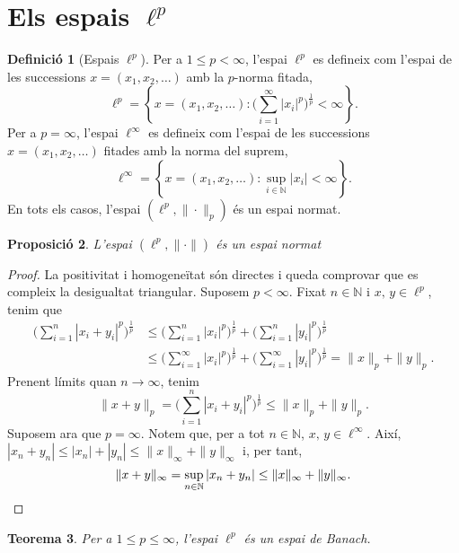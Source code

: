 \documentclass[12pt]{book}
\newtheorem{teorema}{Teorema}[chapter]
\newtheorem{prop}[teorema]{Proposició}
\theoremstyle{definition}
\newtheorem{defi}[teorema]{Definició}
\theoremstyle{nota}
\theoremstyle{exemple}
\begin{document}
\section{Els espais \texorpdfstring{$\ell^p$}{lp}}

\begin{defi}[Espais $\ell^p$]
  Per a $1 \leq p < \infty$, l'espai $\ell^p$ es defineix com l'espai
  de les successions $x = (x_1, x_2, \dotsc)$ amb la $p$-norma fitada,
  \[
    \ell^p = \left\{ x = (x_1, x_2, \dotsc) : \Big(
      \sum_{i=1}^{\infty} |x_i|^p \Big)^{\frac{1}{p}} < \infty
    \right\}.
  \]
  Per a $p = \infty$, l'espai $\ell^\infty$ es defineix com l'espai de
  les successions $x = (x_1, x_2, \dotsc)$ fitades amb la norma del
  suprem,
  \[
    \ell^\infty = \left\{ x = (x_1, x_2, \dotsc) : \sup_{i \in
        \mathbb{N}} |x_i| < \infty \right\}.
  \]
  En tots els casos, l'espai $(\ell^p, \|\cdot\|_p)$ és un espai
  normat.
\end{defi}

\begin{prop}
  L'espai $(\ell^p, \|\cdot\|)$ és un espai normat
\end{prop}

\begin{proof}
  La positivitat i homogeneïtat són directes i queda comprovar que es
  compleix la desigualtat triangular. Suposem $p < \infty$. Fixat
  $n \in \mathbb{N}$ i $x,\, y \in \ell^p$, tenim que
  \begin{align*}
    \Big( \sum_{i=1}^{n} |x_i+y_i|^p \Big)^{\frac{1}{p}}
    &\leq \Big( \sum_{i=1}^{n} |x_i|^p \Big)^{\frac{1}{p}}
      + \Big( \sum_{i=1}^{n} |y_i|^p \Big)^{\frac{1}{p}} \\
    &\leq \Big( \sum_{i=1}^{\infty} |x_i|^p \Big)^{\frac{1}{p}}
      + \Big( \sum_{i=1}^{\infty} |y_i|^p \Big)^{\frac{1}{p}}
      = \|x\|_p + \|y\|_p.
  \end{align*}
  Prenent límits quan $n \to \infty$, tenim
  \[
    \|x+y\|_p = \Big( \sum_{i=1}^{n} |x_i+y_i|^p \Big)^{\frac{1}{p}}
    \leq \|x\|_p + \|y\|_p.
  \]
  Suposem ara que $p = \infty$. Notem que, per a tot
  $n \in \mathbb{N}$, $x,\, y \in \ell^\infty$. Així,
  $|x_n + y_n| \leq |x_n| + |y_n| \leq \|x\|_\infty + \|y\|_\infty$ i,
  per tant,
  \[
    \|x+y\|_\infty = \sup_{n \in \mathbb{N}} |x_n+y_n| \leq
    \|x\|_\infty + \|y\|_\infty. \qedhere
  \]
\end{proof}

\begin{teorema}
  Per a $1 \leq p \leq \infty$, l'espai $\ell^p$ és un espai de
  Banach.
\end{teorema}
\end{document}
